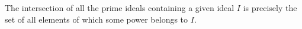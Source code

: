 The intersection of all the prime ideals containing a given ideal $I$ is precisely the set of all elements of which some power belongs to $I$.
